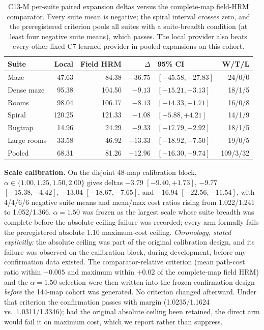 \documentclass[letterpaper]{article} %
\newcommand{\stage}[1]{\textsc{#1}}
\begin{document}
\begin{table}[t]
\centering
\small
\setlength{\tabcolsep}{2.5pt}
\begin{tabular}{@{}lrrrlr@{}}
\toprule
Suite & Local & Field HRM & $\Delta$ & 95\% CI & W/T/L \\
\midrule
Maze & 47.63 & 84.38 & $-36.75$ & $[-45.58,-27.83]$ & 24/0/0 \\
Dense maze & 95.38 & 104.50 & $-9.13$ & $[-15.21,-3.13]$ & 18/1/5 \\
Rooms & 98.04 & 106.17 & $-8.13$ & $[-14.33,-1.71]$ & 16/0/8 \\
Spiral & 120.25 & 121.33 & $-1.08$ & $[-5.88,+4.21]$ & 14/1/9 \\
Bugtrap & 14.96 & 24.29 & $-9.33$ & $[-17.79,-2.92]$ & 18/1/5 \\
Large rooms & 33.58 & 46.92 & $-13.33$ & $[-18.92,-7.50]$ & 19/0/5 \\
\midrule
Pooled & 68.31 & 81.26 & $-12.96$ & $[-16.30,-9.74]$ & 109/3/32 \\
\bottomrule
\end{tabular}
\caption{\stage{C13-M} per-suite paired expansion deltas versus the complete-map field-HRM comparator. Every suite mean is negative; the spiral interval crosses zero, and the preregistered criterion pools all suites with a suite-breadth condition (at least four negative suite means), which passes. The local provider also beats every other fixed \stage{C7} learned provider in pooled expansions on this cohort.}
\label{tab:c13msuite}
\end{table}

\textbf{Scale calibration.} On the disjoint 48-map calibration block, $\alpha\in\{1.00,1.25,1.50,2.00\}$ gives deltas $-3.79$ $[-9.40,+1.73]$, $-9.77$ $[-15.38,-4.42]$, $-13.04$ $[-18.67,-7.65]$, and $-16.94$ $[-22.56,-11.54]$, with 4/4/6/6 negative suite means and mean/max cost ratios rising from 1.022/1.241 to 1.052/1.366. $\alpha{=}1.50$ was frozen as the largest scale whose suite breadth was complete before the absolute-ceiling failure was recorded; every arm formally fails the preregistered absolute 1.10 maximum-cost ceiling. \emph{Chronology, stated explicitly:} the absolute ceiling was part of the original calibration design, and its failure was observed on the calibration block, during development, before any confirmation data existed. The comparator-relative criterion (mean path-cost ratio within $+0.005$ and maximum within $+0.02$ of the complete-map field HRM) and the $\alpha{=}1.50$ selection were then written into the frozen confirmation design \emph{before} the 144-map cohort was generated. No criterion changed afterward. Under that criterion the confirmation passes with margin (1.0235/1.1624 vs.\ 1.0311/1.3346); had the original absolute ceiling been retained, the direct arm would fail it on maximum cost, which we report rather than suppress.
\end{document}
